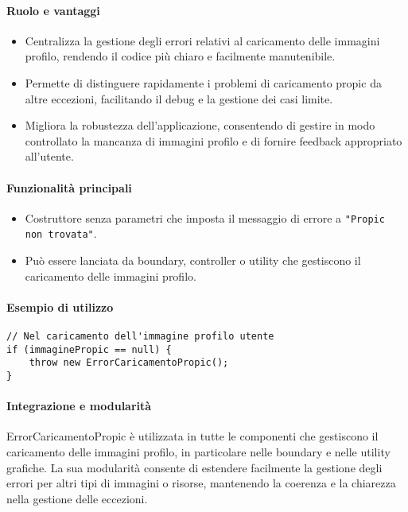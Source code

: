 \paragraph{Ruolo e vantaggi}
\begin{itemize}
    \item Centralizza la gestione degli errori relativi al caricamento delle immagini profilo, rendendo il codice più chiaro e facilmente manutenibile.
    \item Permette di distinguere rapidamente i problemi di caricamento propic da altre eccezioni, facilitando il debug e la gestione dei casi limite.
    \item Migliora la robustezza dell'applicazione, consentendo di gestire in modo controllato la mancanza di immagini profilo e di fornire feedback appropriato all'utente.
\end{itemize}

\paragraph{Funzionalità principali}
\begin{itemize}
    \item Costruttore senza parametri che imposta il messaggio di errore a \texttt{"Propic non trovata"}.
    \item Può essere lanciata da boundary, controller o utility che gestiscono il caricamento delle immagini profilo.
\end{itemize}

\paragraph{Esempio di utilizzo}
\begin{verbatim}
// Nel caricamento dell'immagine profilo utente
if (immaginePropic == null) {
    throw new ErrorCaricamentoPropic();
}
\end{verbatim}

\paragraph{Integrazione e modularità}
ErrorCaricamentoPropic è utilizzata in tutte le componenti che gestiscono il caricamento delle immagini profilo, in particolare nelle boundary e nelle utility grafiche. La sua modularità consente di estendere facilmente la gestione degli errori per altri tipi di immagini o risorse, mantenendo la coerenza e la chiarezza nella gestione delle eccezioni.
